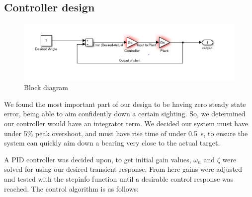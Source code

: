 ﻿\subsection{Controller design}

\begin{figure}
    \begin{center}  
    \includegraphics[width=\columnwidth]{block-diagram.png}    
    \end{center}
    \caption{Block diagram}
    \label{fig:controller1}
\end{figure}

We found the most important part of our design to be having zero steady state error, being able to aim confidently down a certain sighting. So, we determined our controller would have an integrator term. We decided our system must have under 5\% peak overshoot, and must have rise time of under \SI{0.5}{\second}, to ensure the system can quickly aim down a bearing very close to the actual target.

A PID controller was decided upon, to get initial gain values, $\omega_n$ and $\zeta$ were solved for using our desired transient response. From here gains were adjusted and tested with the stepinfo function until a desirable control response was reached. The control algorithm is as follows:
